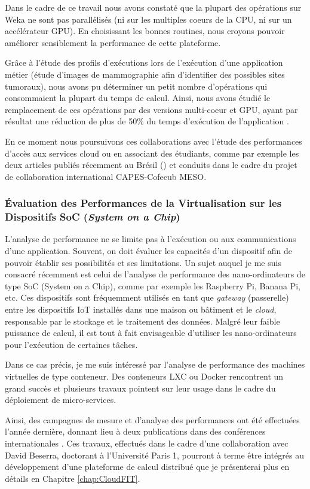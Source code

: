 Dans le cadre de ce travail nous avons constaté que la plupart des opérations sur Weka ne sont pas parallélisés (ni sur les multiples c{oe}urs de la CPU, ni sur un accélérateur GPU). En choisissant les bonnes routines, nous croyons pouvoir améliorer sensiblement la performance de cette plateforme.

Grâce à l'étude des profils d'exécutions lors de l'exécution d'une application métier (étude d'images de mammographie afin d'identifier des possibles sites tumoraux), nous avons pu déterminer un petit nombre d'opérations qui consommaient la plupart du temps de calcul. Ainsi, nous avons étudié le remplacement de ces opérations par des versions multi-c{oe}ur et GPU, ayant par résultat une réduction de plus de 50\% du temps d'exécution de l'application \cite{Engel14a,Engel2015}.

En ce moment nous poursuivons ces collaborations avec l'étude des performances d'accès aux services cloud \cite{Charao17a}  ou en associant des étudiants, comme par exemple les deux articles publiés récemment au Brésil (\cite{Nesi17a, Muenchen17a}) et conduits dans le cadre du projet de collaboration international CAPES-Cofecub MESO.

\subsubsection*{Évaluation des Performances de la Virtualisation sur les Dispositifs SoC (\textit{System on a Chip})}

 L'analyse de performance ne se limite pas à l'exécution ou aux communications d'une application. Souvent, on doit évaluer les capacités d'un dispositif afin de pouvoir établir ses possibilités et ses limitations. Un sujet auquel je me suis consacré récemment est celui de l'analyse de performance des nano-ordinateurs de type SoC (System on a Chip), comme par exemple les Raspberry Pi, Banana Pi, etc. Ces dispositifs sont fréquemment utilisés en tant que \textit{gateway} (passerelle) entre les dispositifs IoT installés dans une maison ou bâtiment et le \textit{cloud}, responsable par le stockage et le traitement des données. Malgré leur faible puissance de calcul, il est tout à fait envisageable d'utiliser les nano-ordinateurs pour l'exécution de certaines tâches.
 
 Dans ce cas précis, je me suis intéressé par l'analyse de performance des machines virtuelles de type conteneur. Des conteneurs LXC ou Docker rencontrent un grand succès et plusieurs travaux pointent sur leur usage dans le cadre du déploiement de micro-services.

Ainsi, des campagnes de mesure et d'analyse des performances ont été effectuées l'année dernière, donnant lieu à deux publications dans des conférences internationales \cite{Beserra17a, Beserra17b}. Ces travaux, effectués dans le cadre d'une collaboration avec David Beserra, doctorant à l'Université Paris 1, pourront à terme être intégrés au développement d'une plateforme de calcul distribué que je présenterai plus en détails en Chapitre \ref{chap:CloudFIT}.